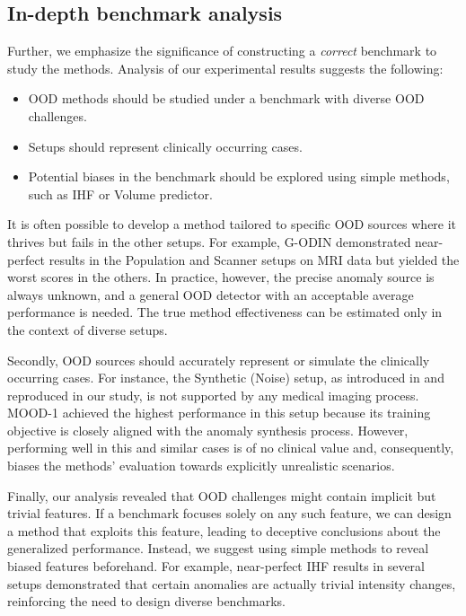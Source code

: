 


\subsection{In-depth benchmark analysis}

Further, we emphasize the significance of constructing a \textit{correct} benchmark to study the methods. Analysis of our experimental results suggests the following:

\begin{itemize}	
	\item OOD methods should be studied under a benchmark with diverse OOD challenges.
	\item Setups should represent clinically occurring cases.
	\item Potential biases in the benchmark should be explored using simple methods, such as IHF or Volume predictor.
\end{itemize}

It is often possible to develop a method tailored to specific OOD sources where it thrives but fails in the other setups. For example, G-ODIN demonstrated near-perfect results in the Population and Scanner setups on MRI data but yielded the worst scores in the others. In practice, however, the precise anomaly source is always unknown, and a general OOD detector with an acceptable average performance is needed. The true method effectiveness can be estimated only in the context of diverse setups.

Secondly, OOD sources should accurately represent or simulate the clinically occurring cases. For instance, the Synthetic (Noise) setup, as introduced in \cite{zimmerer2022mood} and reproduced in our study, is not supported by any medical imaging process. MOOD-1 achieved the highest performance in this setup because its training objective is closely aligned with the anomaly synthesis process. However, performing well in this and similar cases is of no clinical value and, consequently, biases the methods' evaluation towards explicitly unrealistic scenarios.

Finally, our analysis revealed that OOD challenges might contain implicit but trivial features. If a benchmark focuses solely on any such feature, we can design a method that exploits this feature, leading to deceptive conclusions about the generalized performance. Instead, we suggest using simple methods to reveal biased features beforehand. For example, near-perfect IHF results in several setups demonstrated that certain anomalies are actually trivial intensity changes, reinforcing the need to design diverse benchmarks.

